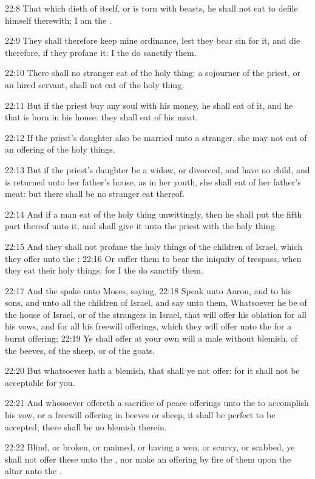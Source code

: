 22:8 That which dieth of itself, or is torn with beasts, he shall not
eat to defile himself therewith; I am the \LORD.

22:9 They shall therefore keep mine ordinance, lest they bear sin for
it, and die therefore, if they profane it: I the \LORD do sanctify
them.

22:10 There shall no stranger eat of the holy thing: a sojourner of
the priest, or an hired servant, shall not eat of the holy thing.

22:11 But if the priest buy any soul with his money, he shall eat of
it, and he that is born in his house: they shall eat of his meat.

22:12 If the priest's daughter also be married unto a stranger, she
may not eat of an offering of the holy things.

22:13 But if the priest's daughter be a widow, or divorced, and have
no child, and is returned unto her father's house, as in her youth,
she shall eat of her father's meat: but there shall be no stranger eat
thereof.

22:14 And if a man eat of the holy thing unwittingly, then he shall
put the fifth part thereof unto it, and shall give it unto the priest
with the holy thing.

22:15 And they shall not profane the holy things of the children of
Israel, which they offer unto the \LORD; 22:16 Or suffer them to bear
the iniquity of trespass, when they eat their holy things: for I the
\LORD do sanctify them.

22:17 And the \LORD spake unto Moses, saying, 22:18 Speak unto Aaron,
and to his sons, and unto all the children of Israel, and say unto
them, Whatsoever he be of the house of Israel, or of the strangers in
Israel, that will offer his oblation for all his vows, and for all his
freewill offerings, which they will offer unto the \LORD for a burnt
offering; 22:19 Ye shall offer at your own will a male without
blemish, of the beeves, of the sheep, or of the goats.

22:20 But whatsoever hath a blemish, that shall ye not offer: for it
shall not be acceptable for you.

22:21 And whosoever offereth a sacrifice of peace offerings unto the
\LORD to accomplish his vow, or a freewill offering in beeves or sheep,
it shall be perfect to be accepted; there shall be no blemish therein.

22:22 Blind, or broken, or maimed, or having a wen, or scurvy, or
scabbed, ye shall not offer these unto the \LORD, nor make an offering
by fire of them upon the altar unto the \LORD.

